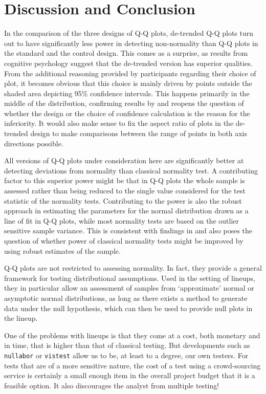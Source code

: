 \documentclass{article}\usepackage[]{graphicx}\usepackage[]{color}
\newcommand{\hh}[1]{{\color{magenta} #1}}
\begin{document}
\section{Discussion and Conclusion}
\hh{In the comparison of the three designs of Q-Q plots, de-trended Q-Q plots turn out to have significantly less power in detecting non-normality than Q-Q plots in the standard and the control design. This comes as a surprise, as results from cognitive psychology suggest that the de-trended version has superior qualities. From the additional reasoning provided by participants regarding their choice of plot, it becomes obvious that this choice is mainly driven by points outside the shaded area depicting 95\% confidence intervals. This happens primarily in the middle of the distribution, confirming results by \citet{buja:2013} and reopens the question of whether the design or the choice of confidence calculation is the reason for the inferiority. It would also make sense to fix the aspect ratio of plots in the de-trended design to make comparisons between the range of points in both axis directions possible.}
\hh{All versions of Q-Q plots under consideration here are significantly better at detecting deviations from normality than classical normality test. A contributing factor to this superior power might be  that in  Q-Q plots the whole sample is assessed rather than being reduced to the single value considered for the test statistic of the normality tests. 
Contributing to the power is also the robust approach in estimating the parameters for the normal distribution drawn as a line of fit in  Q-Q plots, while most normality tests are based on the outlier sensitive sample variance. %
This is consistent with findings in \citet{buja:2013} and  also poses the question of whether power of classical normality tests might  be improved by using robust estimates of the sample.

Q-Q plots are not restricted to assessing normality. In fact, they provide a general framework for testing distributional assumptions. Used in the setting of lineups, they in particular allow an assessment of 
 samples from `approximate' normal or asymptotic normal distributions, as long as there exists a method  to generate data under the null hypothesis, which can then be used to provide null plots in the lineup.
}
\hh{One of the problems with lineups is that they come at a cost, both monetary and in time, that is higher than that of classical testing.
But developments such as {\tt nullabor} \citep{nullabor} or {\tt vistest} \citep{vistest} allow us to be, at least to a degree, our own testers. For tests that are of a more sensitive nature, the cost of a test using a crowd-sourcing service is certainly a small enough item in the overall project budget that it is a feasible 
option. It also discourages the analyst from multiple testing!}
\end{document}
